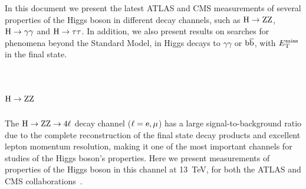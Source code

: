 \documentclass[10pt]{article}
\begin{document}
In this document we present the latest ATLAS and CMS measurements of several
properties of the Higgs boson in different decay channels, such as
${\rm H\to ZZ}$, ${\rm H\to\gamma\gamma}$ and ${\rm H\to\tau\tau}$. In addition,
we also present results on searches for phenomena beyond the Standard Model, in
Higgs decays to $\gamma\gamma$ or ${\rm b\bar{b}}$, with $E_{\rm T}^{\rm miss}$
in the final state.


\section{\boldmath ${\rm H}\to{\rm ZZ}$}

The ${\rm H\to ZZ\to 4\ell}$ decay channel (${\rm \ell = e,\mu}$) has a large
signal-to-background ratio due to the complete reconstruction of the final state
decay products and excellent lepton momentum resolution, making it one of the
most important channels for studies of the Higgs boson's properties. Here we
present measurements of properties of the Higgs boson in this channel at 13~TeV,
for both the ATLAS and CMS collaborations~\cite{ATLAS-ZZ,CMS:2017jkd}.
\end{document}
